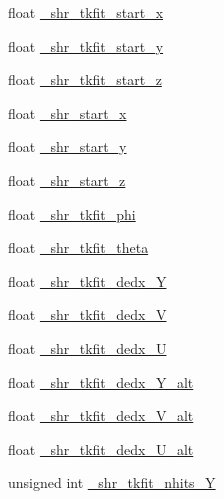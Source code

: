 \begin{DoxyCompactItemize}
\item 
float \hyperlink{classselection_1_1CC0piNpSelection_a44002e3cc4d16dce6e6f61ee3a2bae6a}{\+\_\+shr\+\_\+tkfit\+\_\+start\+\_\+x}
\item 
float \hyperlink{classselection_1_1CC0piNpSelection_acd1826c44855b71bce92253f7ac1a758}{\+\_\+shr\+\_\+tkfit\+\_\+start\+\_\+y}
\item 
float \hyperlink{classselection_1_1CC0piNpSelection_a4d3591a8bb7abd9e320f35ca3bf311c2}{\+\_\+shr\+\_\+tkfit\+\_\+start\+\_\+z}
\item 
float \hyperlink{classselection_1_1CC0piNpSelection_ac0fb4dbd656f2f3fb2c12ffc02a0df7c}{\+\_\+shr\+\_\+start\+\_\+x}
\item 
float \hyperlink{classselection_1_1CC0piNpSelection_ade6717f479b053a2c2c9082e597d599f}{\+\_\+shr\+\_\+start\+\_\+y}
\item 
float \hyperlink{classselection_1_1CC0piNpSelection_a6e8b4637c8de2991e4d48291d3e90ddf}{\+\_\+shr\+\_\+start\+\_\+z}
\item 
float \hyperlink{classselection_1_1CC0piNpSelection_aefb0bc61c417330a448ababb5363ad8f}{\+\_\+shr\+\_\+tkfit\+\_\+phi}
\item 
float \hyperlink{classselection_1_1CC0piNpSelection_a11df391e482434665c389423bbb9ec5d}{\+\_\+shr\+\_\+tkfit\+\_\+theta}
\item 
float \hyperlink{classselection_1_1CC0piNpSelection_ababbbc32babdef645c2edc613713ceb7}{\+\_\+shr\+\_\+tkfit\+\_\+dedx\+\_\+Y}
\item 
float \hyperlink{classselection_1_1CC0piNpSelection_a428fc549513bea0e1ca92cf90c1148cd}{\+\_\+shr\+\_\+tkfit\+\_\+dedx\+\_\+V}
\item 
float \hyperlink{classselection_1_1CC0piNpSelection_aaaef69409457695e2300bf847a13804c}{\+\_\+shr\+\_\+tkfit\+\_\+dedx\+\_\+U}
\item 
float \hyperlink{classselection_1_1CC0piNpSelection_a581a6115360136c7364f421b9f1ca4fe}{\+\_\+shr\+\_\+tkfit\+\_\+dedx\+\_\+\+Y\+\_\+alt}
\item 
float \hyperlink{classselection_1_1CC0piNpSelection_aee315f8b5aefc0716f228901b1816939}{\+\_\+shr\+\_\+tkfit\+\_\+dedx\+\_\+\+V\+\_\+alt}
\item 
float \hyperlink{classselection_1_1CC0piNpSelection_af4cca20b2f900cbff5390127a05b6f9d}{\+\_\+shr\+\_\+tkfit\+\_\+dedx\+\_\+\+U\+\_\+alt}
\item 
unsigned int \hyperlink{classselection_1_1CC0piNpSelection_ae3a53326b19594013c9df08b66ccaa73}{\+\_\+shr\+\_\+tkfit\+\_\+nhits\+\_\+Y}
\item 

\end{DoxyCompactItemize}
